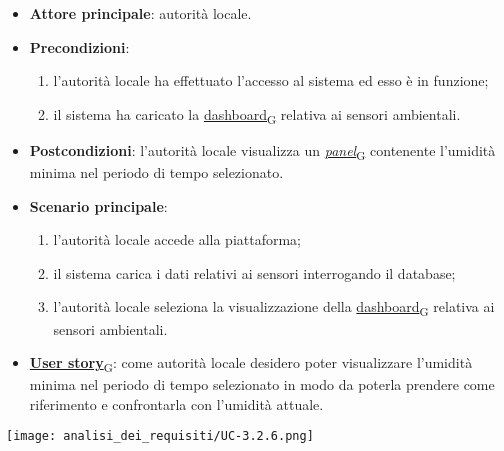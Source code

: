 \newpage
{}
\begin{itemize}
	\item \textbf{Attore principale}: autorità locale.
	\item \textbf{Precondizioni}:
	      \begin{enumerate}
		      \item l'autorità locale ha effettuato l'accesso al sistema ed esso è in funzione;
		      \item il sistema ha caricato la \href{https://7last.github.io/docs/pb/documentazione-interna/glossario\#dashboard}{dashboard\textsubscript{G}} relativa ai sensori ambientali.
	      \end{enumerate}
	\item \textbf{Postcondizioni}: l'autorità locale visualizza un \href{https://7last.github.io/docs/pb/documentazione-interna/glossario\#panel}{\textit{panel}\textsubscript{G}} contenente l'umidità minima nel periodo di tempo selezionato.
	\item \textbf{Scenario principale}:
	      \begin{enumerate}
		      \item l'autorità locale accede alla piattaforma;
		      \item il sistema carica i dati relativi ai sensori interrogando il database;
		      \item l'autorità locale seleziona la visualizzazione della \href{https://7last.github.io/docs/pb/documentazione-interna/glossario\#dashboard}{dashboard\textsubscript{G}} relativa ai sensori ambientali.
	      \end{enumerate}
	\item \href{https://7last.github.io/docs/pb/documentazione-interna/glossario\#user-story}{\textbf{User story}\textsubscript{G}}:
	      come autorità locale desidero poter visualizzare l'umidità minima nel periodo di tempo selezionato
	      in modo da poterla prendere come riferimento e confrontarla con l'umidità attuale.
\end{itemize}
\begin{center}
	\texttt{[image: analisi\_dei\_requisiti/UC-3.2.6.png]}
\end{center}

